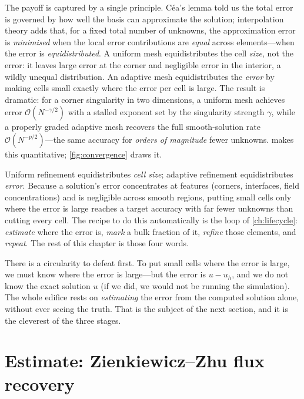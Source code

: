 The payoff is captured by a single principle. C\'ea's lemma told us the total error
is governed by how well the basis can approximate the solution; interpolation theory
adds that, for a fixed total number of unknowns, the approximation error is
\emph{minimised} when the local error contributions are \emph{equal} across
elements---when the error is \emph{equidistributed}. A uniform mesh equidistributes
the cell \emph{size}, not the error: it leaves large error at the corner and
negligible error in the interior, a wildly unequal distribution. An adaptive mesh
equidistributes the \emph{error} by making cells small exactly where the error per
cell is large. The result is dramatic: for a corner singularity in two dimensions, a
uniform mesh achieves error $\mathcal{O}(N^{-\gamma/2})$ with a stalled exponent set
by the singularity strength $\gamma$, while a properly graded adaptive mesh recovers
the full smooth-solution rate $\mathcal{O}(N^{-p/2})$---the same accuracy for
\emph{orders of magnitude} fewer unknowns.  makes this
quantitative; \cref{fig:convergence} draws it.

\begin{keyidea}
Uniform refinement equidistributes \emph{cell size}; adaptive refinement
equidistributes \emph{error}. Because a solution's error concentrates at features
(corners, interfaces, field concentrations) and is negligible across smooth regions,
putting small cells only where the error is large reaches a target accuracy with far
fewer unknowns than cutting every cell. The recipe to do this automatically is the
loop of \cref{ch:lifecycle}: \emph{estimate} where the error is, \emph{mark} a bulk
fraction of it, \emph{refine} those elements, and \emph{repeat}. The rest of this
chapter is those four words.
\end{keyidea}

There is a circularity to defeat first. To put small cells where the error is large,
we must know where the error is large---but the error is $u - u_h$, and we do not
know the exact solution $u$ (if we did, we would not be running the simulation). The
whole edifice rests on \emph{estimating} the error from the computed solution alone,
without ever seeing the truth. That is the subject of the next section, and it is the
cleverest of the three stages.

\section{Estimate: Zienkiewicz--Zhu flux recovery}
\label{sec:estimate}

